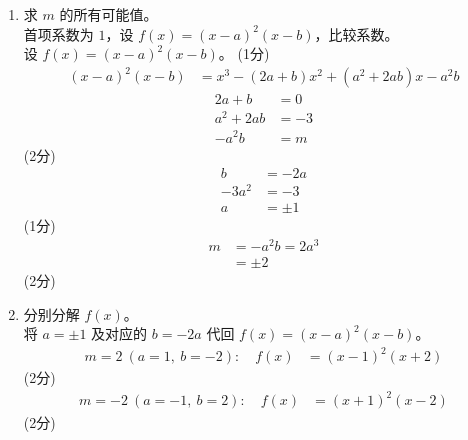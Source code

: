 \documentclass{exam-zh}
\begin{document}
\begin{solution}
    \begin{enumerate}[label=(\alph*)]
        \item 求 $m$ 的所有可能值。 \\
        首项系数为 $1$，设 $f(x)=(x-a)^2(x-b)$，比较系数。 \\
        设 $f(x)=(x-a)^2(x-b)$。
        \hfill (1分)
        \begin{align*}
            (x-a)^2(x-b) &= x^3-(2a+b)x^2+(a^2+2ab)x-a^2b
        \end{align*}
        \begin{align*}
            2a+b &= 0 \\
            a^2+2ab &= -3 \\
            -a^2b &= m
        \end{align*}
        \hfill (2分) \\
        \begin{align*}
            b &= -2a \\
            -3a^2 &= -3 \\
            a &= \pm 1
        \end{align*}
        \hfill (1分) \\
        \begin{align*}
            m &= -a^2b = 2a^3 \\
            &= \pm 2
        \end{align*}
        \hfill (2分)

        \item 分别分解 $f(x)$。 \\
        将 $a=\pm1$ 及对应的 $b=-2a$ 代回 $f(x)=(x-a)^2(x-b)$。
        \begin{align*}
            m=2\ (a=1,\ b=-2):\quad f(x) &= (x-1)^2(x+2)
        \end{align*}
        \hfill (2分) \\
        \begin{align*}
            m=-2\ (a=-1,\ b=2):\quad f(x) &= (x+1)^2(x-2)
        \end{align*}
        \hfill (2分)
    \end{enumerate}
\end{solution}

\newpage
\end{document}
